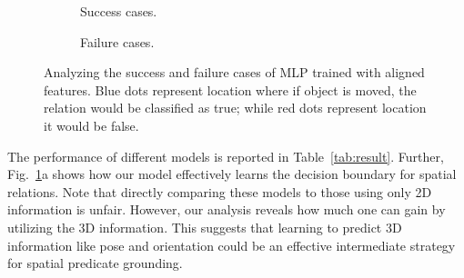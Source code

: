 \documentclass{article}
\newcommand{\smallsec}[1]{\noindent {\bf #1.}}
\begin{document}
\begin{figure}
    \begin{subfigure}[b]{0.49\textwidth}
        \begin{subfigure}{0.48\textwidth}
        \end{subfigure}
        \begin{subfigure}{0.48\textwidth}
        \end{subfigure}
        \caption{\scriptsize{Success cases.}}
    \end{subfigure}
    \begin{subfigure}[b]{0.49\textwidth}
        \begin{subfigure}{0.48\textwidth}
        \end{subfigure}
        \begin{subfigure}{0.48\textwidth}
        \end{subfigure}
        \caption{\scriptsize{Failure cases.}}
    \end{subfigure}\vspace{-1em}
    \caption{Analyzing the success and failure cases of MLP trained with aligned features. Blue dots represent location where if object is moved, the relation would be classified as true; while red dots represent location it would be false.\vspace{-2em}}
    \label{fig:3d}
\end{figure}

\smallsec{Results}
The performance of different models is reported in Table~\ref{tab:result}. Further, Fig.~\ref{fig:3d}a shows how our model effectively learns the decision boundary for spatial relations. Note that directly comparing these models to those using only 2D information is unfair. However, our analysis reveals how much one can gain by utilizing the 3D information. This suggests that learning to predict 3D information like pose and orientation could be an effective intermediate strategy for spatial predicate grounding.
\end{document}
